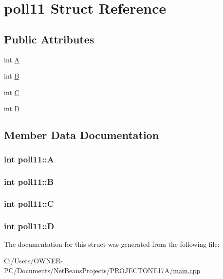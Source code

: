 \hypertarget{structpoll11}{\section{poll11 Struct Reference}
\label{structpoll11}
}
\subsection*{Public Attributes}
\begin{DoxyCompactItemize}
\item 
int \hyperlink{structpoll11_a19d65e54cbe2e08636b7d57b5d4670cd}{A}
\item 
int \hyperlink{structpoll11_a02b7e217fc545074b5d7178c15d66506}{B}
\item 
int \hyperlink{structpoll11_aa9558fe08241afc40f2beb67d251b0db}{C}
\item 
int \hyperlink{structpoll11_a36e956ee10b6e3f7c8173e225d9c2e40}{D}
\end{DoxyCompactItemize}


\subsection{Member Data Documentation}
\hypertarget{structpoll11_a19d65e54cbe2e08636b7d57b5d4670cd}{
\subsubsection[{A}]{\setlength{\rightskip}{0pt plus 5cm}int poll11\+::\+A}}\label{structpoll11_a19d65e54cbe2e08636b7d57b5d4670cd}
\hypertarget{structpoll11_a02b7e217fc545074b5d7178c15d66506}{
\subsubsection[{B}]{\setlength{\rightskip}{0pt plus 5cm}int poll11\+::\+B}}\label{structpoll11_a02b7e217fc545074b5d7178c15d66506}
\hypertarget{structpoll11_aa9558fe08241afc40f2beb67d251b0db}{
\subsubsection[{C}]{\setlength{\rightskip}{0pt plus 5cm}int poll11\+::\+C}}\label{structpoll11_aa9558fe08241afc40f2beb67d251b0db}
\hypertarget{structpoll11_a36e956ee10b6e3f7c8173e225d9c2e40}{
\subsubsection[{D}]{\setlength{\rightskip}{0pt plus 5cm}int poll11\+::\+D}}\label{structpoll11_a36e956ee10b6e3f7c8173e225d9c2e40}


The documentation for this struct was generated from the following file\+:\begin{DoxyCompactItemize}
\item 
C\+:/\+Users/\+O\+W\+N\+E\+R-\/\+P\+C/\+Documents/\+Net\+Beans\+Projects/\+P\+R\+O\+J\+E\+C\+T\+O\+N\+E17\+A/\hyperlink{main_8cpp}{main.\+cpp}\end{DoxyCompactItemize}
